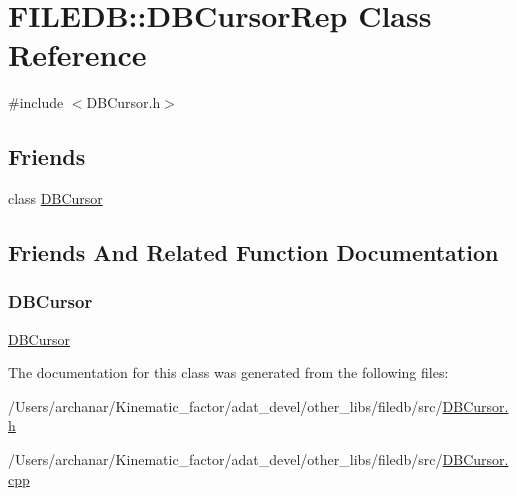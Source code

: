 \hypertarget{classFILEDB_1_1DBCursorRep}{}\section{F\+I\+L\+E\+DB\+:\+:D\+B\+Cursor\+Rep Class Reference}
\label{classFILEDB_1_1DBCursorRep}


{\ttfamily \#include $<$D\+B\+Cursor.\+h$>$}

\subsection*{Friends}
\begin{DoxyCompactItemize}
\item 
class \mbox{\hyperlink{classFILEDB_1_1DBCursorRep_abba58dba404558c3cb4da3d36e1b1bb8}{D\+B\+Cursor}}
\end{DoxyCompactItemize}


\subsection{Friends And Related Function Documentation}
\mbox{\label{classFILEDB_1_1DBCursorRep_abba58dba404558c3cb4da3d36e1b1bb8}} 
\subsubsection{\texorpdfstring{DBCursor}{DBCursor}}
{\footnotesize\ttfamily \mbox{\hyperlink{classFILEDB_1_1DBCursor}{D\+B\+Cursor}}\hspace{0.3cm}{\ttfamily [friend]}}



The documentation for this class was generated from the following files\+:\begin{DoxyCompactItemize}
\item 
/\+Users/archanar/\+Kinematic\+\_\+factor/adat\+\_\+devel/other\+\_\+libs/filedb/src/\mbox{\hyperlink{other__libs_2filedb_2src_2DBCursor_8h}{D\+B\+Cursor.\+h}}\item 
/\+Users/archanar/\+Kinematic\+\_\+factor/adat\+\_\+devel/other\+\_\+libs/filedb/src/\mbox{\hyperlink{DBCursor_8cpp}{D\+B\+Cursor.\+cpp}}\end{DoxyCompactItemize}
